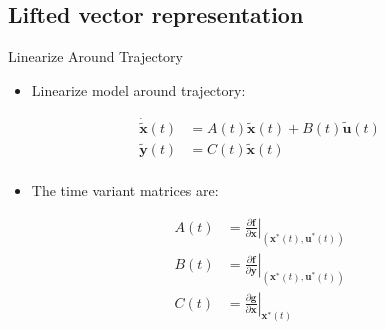 \documentclass[handout]{beamer}
\newcommand{\state}{\mathbf{x}} %
\newcommand{\sysInput}{\mathbf{u}} %
\newcommand{\observations}{\mathbf{y}} %
\newcommand\at[2]{\left.#1\right|_{#2}} %
\begin{document}
\subsection{Lifted vector representation}
%
\begin{frame}{Linearize Around Trajectory}
\begin{itemize}
\item Linearize model around trajectory: \pause
\end{itemize}
\begin{equation*}
\begin{aligned}
\dot{\tilde{\state}}(t) &= A(t)\tilde{\state}(t) + B(t)\tilde{\sysInput}(t) \\
\tilde{\observations}(t) &= C(t)\tilde{\state}(t) \\
\end{aligned}
\end{equation*} \pause
\begin{itemize}
\item The time variant matrices are: \pause
\linebreak
\end{itemize}
\begin{equation*}
\begin{aligned}
A(t) & = \at{\frac{\partial{\mathbf{f}}}{\partial{\state}}}{(\state^{*}(t),\sysInput^{*}(t))} \\
B(t) & = \at{\frac{\partial{\mathbf{f}}}{\partial{\observations}}}{(\state^{*}(t),\sysInput^{*}(t))} \\
C(t) & = \at{\frac{\partial{\mathbf{g}}}{\partial{\state}}}{\state^{*}(t)} \\
\end{aligned}
\end{equation*}
\end{frame}
%
\end{document}
